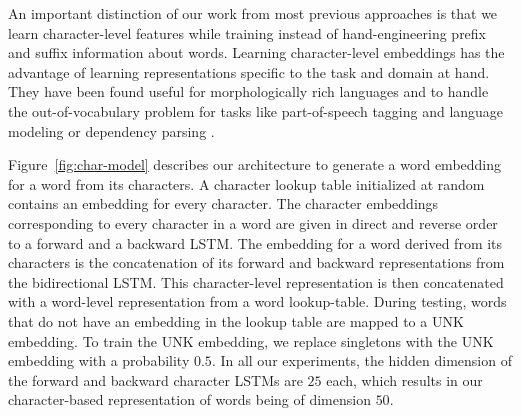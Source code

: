 \documentclass[11pt,letterpaper]{article}
\begin{document}
An important distinction of our work from most previous approaches is that we learn character-level features while training instead of hand-engineering prefix and suffix information about words. Learning character-level embeddings has the advantage of learning representations specific to the task and domain at hand. They have been found useful for morphologically rich languages and to handle the out-of-vocabulary problem for tasks like part-of-speech tagging and language modeling \cite{ling:2015} or dependency parsing \cite{lstmemnlp15}.

Figure~\ref{fig:char-model} describes our architecture to generate a word embedding for a word from its characters. A character lookup table initialized at random contains an embedding for every character. The character embeddings corresponding to every character in a word are given in direct and reverse order to a forward and a backward LSTM. The embedding for a word derived from its characters is the concatenation of its forward and backward representations from the bidirectional LSTM. This character-level representation is then concatenated with a word-level representation from a word lookup-table. During testing, words that do not have an embedding in the lookup table are mapped to a UNK embedding. To train the UNK embedding, we replace singletons with the UNK embedding with a probability $0.5$. In all our experiments, the hidden dimension of the forward and backward character LSTMs are $25$ each, which results in our character-based representation of words being of dimension $50$.
\end{document}
